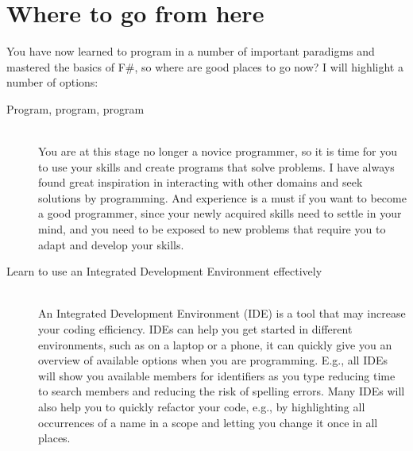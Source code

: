 \chapter{Where to go from here}
\label{chap:future}

You have now learned to program in a number of important paradigms and mastered the basics of F\#, so where are good places to go now? I will highlight a number of options:
\begin{description}
\item[Program, program, program]~\\
  You are at this stage no longer a novice programmer, so it is time for you to use your skills and create programs that solve problems. I have always found great inspiration in interacting with other domains and seek solutions by programming. And experience is a must if you want to become a good programmer, since your newly acquired skills need to settle in your mind, and you need to be exposed to new problems that require you to adapt and develop your skills.
\item[Learn to use an Integrated Development Environment effectively]~\\
  An Integrated Development Environment (IDE) is a tool that may increase your coding efficiency. IDEs can help you get started in different environments, such as on a laptop or a phone, it can quickly give you an overview of available options when you are programming.  E.g., all IDEs will show you available members for identifiers as you type reducing time to search members and reducing the risk of spelling errors. Many IDEs will also help you to quickly refactor your code, e.g., by highlighting all occurrences of a name in a scope and letting you change it once in all places.


\end{description}
